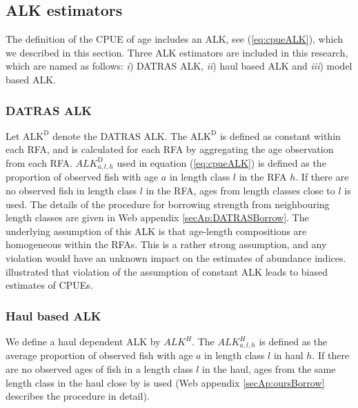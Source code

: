 \documentclass[a4paper 12pt]{article}
\numberwithin{equation}{section}
\begin{document}
\subsection{ALK estimators}
\label{sec:alkmethods}

The definition of the CPUE of age includes an ALK, see (\ref{eq:cpueALK}), which we described in this section. Three ALK estimators are included in this research, which are named as follows:  \textit{i}) DATRAS ALK, \textit{ii}) haul based ALK and \textit{iii}) model based ALK.
\subsubsection{DATRAS ALK}
\label{sec:datrasalkestimator}
Let $\text{ALK}^{\text{D}}$ denote the DATRAS ALK. The $\text{ALK}^{\text{D}}$ is defined as constant within each RFA, and is calculated for each RFA by aggregating the age observation from each RFA. $ALK^{\text{D}}_{a,l,h}$ used in equation (\ref{eq:cpueALK}) is defined as the proportion of observed fish with age $a$ in length class $l$ in the RFA $h$. If there are no observed fish in length class $l$ in the RFA, ages from length classes close to $l$ is used. The details of the procedure for borrowing strength from neighbouring length classes are given in Web appendix \ref{secAp:DATRASBorrow}. The underlying assumption of this ALK  is that age-length compositions are homogeneous within the RFAs. This is a rather strong assumption, and any violation would have an unknown impact on the estimates of abundance indices. \citet{aanes2015efficient} illustrated that violation of the assumption of constant ALK leads to biased estimates of CPUEs. 

\subsubsection{Haul based ALK}
\label{sec:haulestimator}
We define a haul dependent ALK  by  $ALK^{H}$. The $ALK^{H}_{a,l,h}$ is defined as the average proportion of observed fish with age $a$ in  length class $l$ in haul $h$. If there are no observed ages of fish in a length class $l$ in the haul, ages from the same length class in the haul close by is used (Web appendix \ref{secAp:oursBorrow} describes the procedure in detail).
\end{document}
